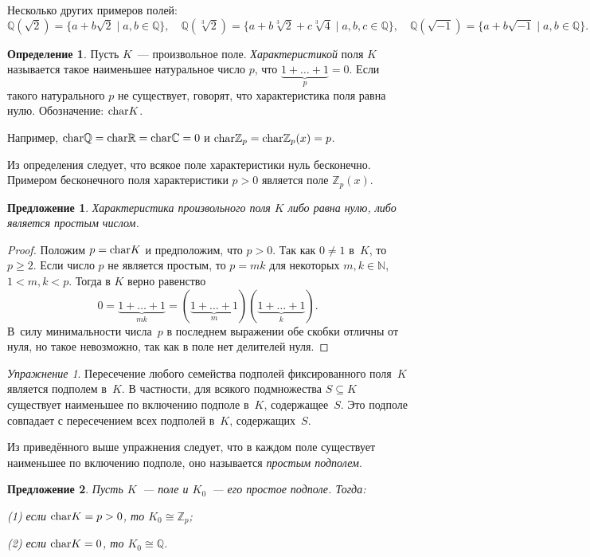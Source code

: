 \documentclass[a4paper, 12pt]{article}
\def\CC{{\mathbb C}}%
\def\ZZ{{\mathbb Z}}%
\def\RR{{\mathbb R}}%
\def\NN{{\mathbb N}}%
\def\QQ{{\mathbb Q}}%
\def\xar{{\rm char}}%
\newtheorem{proposition}{Предложение}
\theoremstyle{definition}
\newtheorem{definition}{Определение}
\theoremstyle{remark}
\newtheorem{exercise}{Упражнение}
\begin{document}
Несколько других примеров полей:
$$
\QQ(\sqrt{2}) = \{a + b \sqrt{2} \mid a, b \in \QQ\}, \quad
\QQ(\sqrt[3]{2}) = \{a + b \sqrt[3]{2} + c\sqrt[3]{4} \mid a, b,
c\in\QQ\}, \quad \QQ(\sqrt{-1}) = \{a + b\sqrt{-1} \mid a, b \in \QQ
\}.
$$

\begin{definition}
Пусть $K$~--- произвольное поле. {\it Характеристикой} поля $K$
называется такое наименьшее натуральное число $p$, что
$\underbrace{1+\ldots+1}_p = 0$. Если такого натурального $p$ не
существует, говорят, что характеристика поля равна нулю.
Обозначение: $\xar K$.
\end{definition}

Например, $\xar \QQ = \xar \RR = \xar \CC = 0$ и $\xar \ZZ_p = \xar
\ZZ_p(x) = p$.

Из определения следует, что всякое поле характеристики нуль
бесконечно. Примером бесконечного поля характеристики $p > 0$
является поле $\ZZ_p(x)$.

\begin{proposition}
Характеристика произвольного поля $K$ либо равна нулю, либо является
простым числом.
\end{proposition}

\begin{proof}
Положим $p = \xar K$ и предположим, что $p > 0$. Так как $0 \ne 1$
в~$K$, то $p \geqslant 2$. Если число $p$ не является простым, то $p
= mk$ для некоторых $m,k \in \NN$, $1 < m,k < p$. Тогда в $K$ верно
равенство
$$
0 = \underbrace{1 + \ldots + 1}_{mk} = (\underbrace{1 + \ldots +
1}_m)(\underbrace{1 + \ldots + 1}_k).
$$
В~силу минимальности числа~$p$ в последнем выражении обе скобки
отличны от нуля, но такое невозможно, так как в поле нет делителей
нуля.
\end{proof}

\begin{exercise}
Пересечение любого семейства подполей фиксированного поля~$K$
является подполем в~$K$. В частности, для всякого подмножества $S
\subseteq K$ существует наименьшее по включению подполе в~$K$,
содержащее~$S$. Это подполе совпадает с пересечением всех подполей
в~$K$, содержащих~$S$.
\end{exercise}

Из приведённого выше упражнения следует, что в каждом поле
существует наименьшее по включению подполе, оно называется {\it
простым подполем}.

\begin{proposition}
Пусть $K$~--- поле и $K_0$~--- его простое подполе. Тогда:

\textup{(1)} если $\xar K = p > 0$, то $K_0 \cong \ZZ_p$;

\textup{(2)} если $\xar K = 0$, то $K_0 \cong \QQ$.
\end{proposition}
\end{document}
